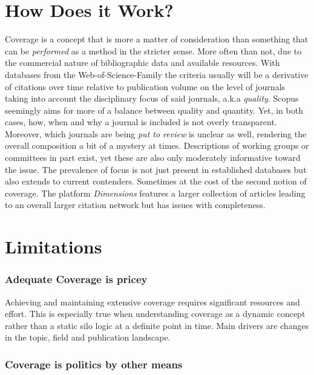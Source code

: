 \documentclass[
  letterpaper,
]{scrreprt}
\begin{document}
\section{How Does it Work?}\label{how-does-it-work-1}

Coverage is a concept that is more a matter of consideration than
something that can be \emph{performed} as a method in the stricter
sense. More often than not, due to the commercial nature of
bibliographic data and available resources. With databases from the
Web-of-Science-Family the criteria usually will be a derivative of
citations over time relative to publication volume on the level of
journals taking into account the disciplinary focus of said journals,
a.k.a \emph{quality}. Scopus seemingly aims for more of a balance
between quality and quantity. Yet, in both cases, how, when and why a
journal is included is not overly transparent. Moreover, which journals
are being \emph{put to review} is unclear as well, rendering the overall
composition a bit of a mystery at times. Descriptions of working groups
or committees in part exist, yet these are also only moderately
informative toward the issue. The prevalence of focus is not just
present in established databases but also extends to current contenders.
Sometimes at the cost of the second notion of coverage. The platform
\emph{Dimensions} features a larger collection of articles leading to an
overall larger citation network but has issues with completeness.

\section{Limitations}\label{limitations-2}

\subsubsection{Adequate Coverage is
pricey}\label{adequate-coverage-is-pricey}

Achieving and maintaining extensive coverage requires significant
resources and effort. This is especially true when understanding
coverage as a dynamic concept rather than a static silo logic at a
definite point in time. Main drivers are changes in the topic, field and
publication landscape.

\subsubsection{Coverage is politics by other
means}\label{coverage-is-politics-by-other-means}
\end{document}
